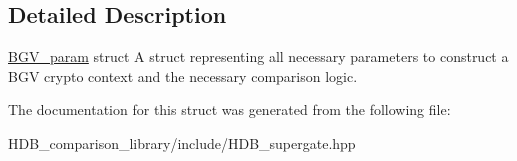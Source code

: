 \subsection{Detailed Description}
\hyperlink{structHDB__supergate___1_1BGV__param}{B\+G\+V\+\_\+param} struct A struct representing all necessary parameters to construct a B\+GV crypto context and the necessary comparison logic. 

The documentation for this struct was generated from the following file\+:\begin{DoxyCompactItemize}
\item 
H\+D\+B\+\_\+comparison\+\_\+library/include/H\+D\+B\+\_\+supergate.\+hpp\end{DoxyCompactItemize}
